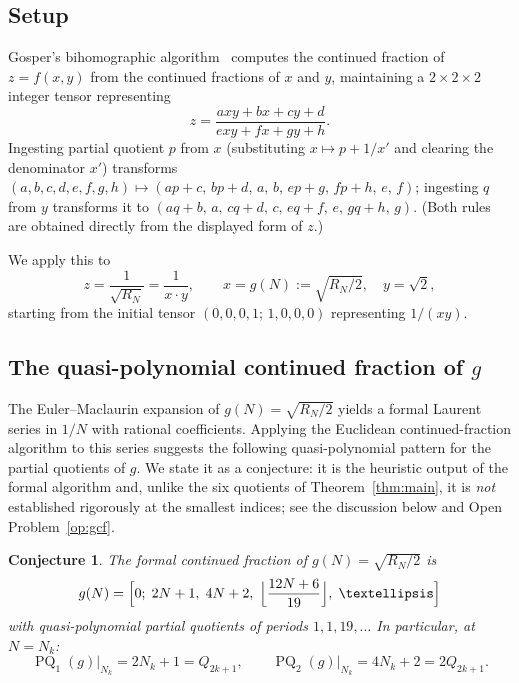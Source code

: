 \documentclass[10pt,a4paper]{amsart}
\newtheorem{conjecture}[theorem]{Conjecture}
\DeclareMathOperator{\PQ}{PQ}
\begin{document}
\subsection{Setup}

Gosper's bihomographic algorithm~\cite{Gosper1972} computes the
continued fraction of $z = f(x,y)$ from the continued fractions of
$x$ and $y$, maintaining a $2\times2\times2$ integer tensor representing
\[
  z = \frac{axy+bx+cy+d}{exy+fx+gy+h}.
\]
Ingesting partial quotient $p$ from $x$ (substituting $x \mapsto p+1/x'$
and clearing the denominator $x'$) transforms
$(a,b,c,d,e,f,g,h) \mapsto (ap+c,\,bp+d,\,a,\,b,\,ep+g,\,fp+h,\,e,\,f)$;
ingesting $q$ from $y$ transforms it to
$(aq+b,\,a,\,cq+d,\,c,\,eq+f,\,e,\,gq+h,\,g)$.  (Both rules are obtained
directly from the displayed form of $z$.)

We apply this to
\[
  z = \frac{1}{\sqrt{R_N}} = \frac{1}{x \cdot y},
  \qquad
  x = g(N) := \sqrt{R_N/2}, \quad y = \sqrt{2},
\]
starting from the initial tensor $(0,0,0,1;\,1,0,0,0)$ representing $1/(xy)$.

\subsection{The quasi-polynomial continued fraction of $g$}

The Euler--Maclaurin expansion of $g(N) = \sqrt{R_N/2}$ yields a
formal Laurent series in $1/N$ with rational coefficients.  Applying
the Euclidean continued-fraction algorithm to this series suggests the
following quasi-polynomial pattern for the partial quotients of $g$.
We state it as a conjecture: it is the heuristic output of the formal
algorithm and, unlike the six quotients of Theorem~\ref{thm:main}, it is
\emph{not} established rigorously at the smallest indices; see the
discussion below and Open Problem~\ref{op:gcf}.

\begin{conjecture}\label{prop:gcf}
  The formal continued fraction of $g(N) = \sqrt{R_N/2}$ is
  \begin{equation}\label{eq:gcf}
    g(N) = \Bigl[0;\; 2N+1,\; 4N+2,\;
            \Bigl\lfloor\frac{12N+6}{19}\Bigr\rfloor,\; \ldots\Bigr]
  \end{equation}
  with quasi-polynomial partial quotients of periods $1, 1, 19, \ldots$
  In particular, at $N = N_k$:
  \begin{equation}\label{eq:gcf-pell}
    \PQ_1(g)\big|_{N_k} = 2N_k+1 = Q_{2k+1}, \qquad
    \PQ_2(g)\big|_{N_k} = 4N_k+2 = 2Q_{2k+1}.
  \end{equation}
\end{conjecture}
\end{document}
